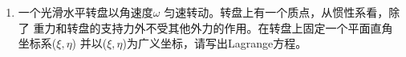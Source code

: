 \begin{enumerate}
    计算\[|\overrightarrow{OA}-\overrightarrow{OA_0}|
    =\left|\sqrt{\bigg(\!-\frac{1}{2}l+x_1\bigg)^2+\bigg(\frac{\sqrt{3}}{2}l+y_1\bigg)^2}-l\right|.\]
    约去二阶小量可得结果为
    $\big|\!-\frac{1}{2}x_1+\frac{\sqrt{3}}{2}y_1\big|$.同理可得
    \[|\overrightarrow{OB}-\overrightarrow{OB_0}|=\left|\frac{1}{2}x_1+\frac{\sqrt{3}}{2}y_1\right|,
    \quad|\overrightarrow{AB}-\overrightarrow{A_0B_0}|=|x_1-x_2|.\]
    再结合$U=\frac{1}{2}k(\Delta x)^2$即求得Lagrange函数.

    从而对应的Lagrange方程为
    $$\begin{pmatrix}
        \ddot{x_1}\\ \\
        \ddot{y_1}\\ \\
        \ddot{x_2}\\ \\
        \ddot{y_2}\\
    \end{pmatrix}=
    \frac{\omega_0^2}{4}
    \begin{pmatrix}
        5 & -\sqrt{3} & -4 & 0 \\ \\
        -\sqrt{3} & 3 & 0 & 0 \\ \\
        -4 & 0 & 5 & \sqrt{3}\\ \\
        0 & 0 & \sqrt{3} & 3 \\
    \end{pmatrix}
    \begin{pmatrix}
        x_1 \\ \\
        x_2 \\ \\
        x_3 \\ \\
        x_4 \\
    \end{pmatrix}
    $$
    其中$\omega_0=\sqrt{\dfrac{k}{m}}$.

    上述$4\times4$矩阵的特征值为$0,1,\dfrac{3\pm\sqrt{3}}{2}$,故固有角频率为
    $\dfrac{1}{2}\sqrt{\dfrac{k}{m}},\dfrac{1}{2}\sqrt{\dfrac{3\pm\sqrt{3}}{2}}\sqrt{\dfrac{k}{m}}$.

    \item 一个光滑水平转盘以角速度$\omega$ 匀速转动。转盘上有一个质点，从惯性系看，除了
    重力和转盘的支持力外不受其他外力的作用。在转盘上固定一个平面直角坐标系($\xi, \eta$)
    并以($\xi, \eta$)为广义坐标，请写出Lagrange方程。


\end{enumerate}
